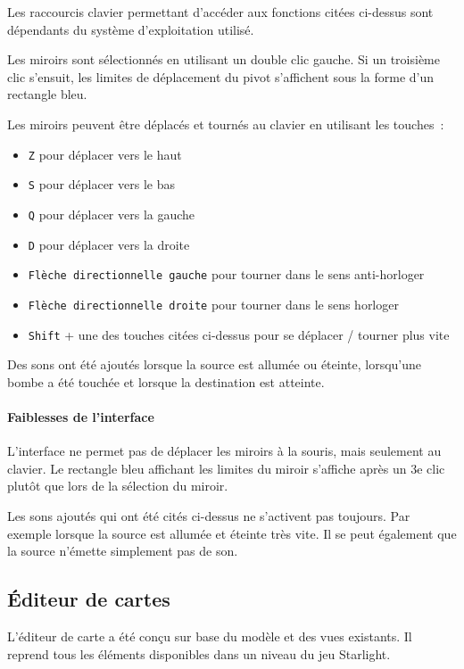\documentclass[]{article}
\begin{document}
Les raccourcis clavier permettant d'accéder aux fonctions citées ci-dessus sont dépendants
du système d'exploitation utilisé.

Les miroirs sont sélectionnés en utilisant un double clic gauche.
Si un troisième clic s’ensuit, les limites de déplacement du pivot s'affichent
sous la forme d'un rectangle bleu.

Les miroirs peuvent être déplacés et tournés au clavier en utilisant les touches~:

\begin{itemize}
	\item \texttt{Z} pour déplacer vers le haut
	\item \texttt{S} pour déplacer vers le bas
	\item \texttt{Q} pour déplacer vers la gauche
	\item \texttt{D} pour déplacer vers la droite
	\item \texttt{Flèche directionnelle gauche} pour tourner dans le sens
		anti-horloger
	\item \texttt{Flèche directionnelle droite} pour tourner dans le sens
		horloger
    \item \texttt{Shift} + une des touches citées ci-dessus pour se déplacer / tourner
        plus vite
\end{itemize}

Des sons ont été ajoutés lorsque la source est allumée ou éteinte, 
lorsqu'une bombe a été touchée et lorsque la destination
est atteinte.

\paragraph{Faiblesses de l'interface} 

L'interface ne permet pas de déplacer les miroirs à la souris, mais seulement au clavier.
Le rectangle bleu affichant les limites du miroir s'affiche après un 3e clic plutôt 
que lors de la sélection du miroir.

Les sons ajoutés qui ont été cités ci-dessus ne s'activent pas toujours.
Par exemple lorsque la source est allumée et éteinte très vite.
Il se peut également que la source n'émette simplement pas de son.

\newpage
\subsection{\label{Editeur}Éditeur de cartes}

L’éditeur de carte a été conçu sur base du modèle et des vues existants.
Il reprend tous les éléments disponibles dans un niveau du jeu Starlight.
\end{document}
